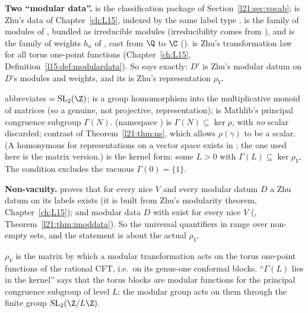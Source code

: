 \begin{dictionary}
\textbf{Two ``modular data''.}  is the classification package of
Section~\ref{l21:sec:vocab};  is Zhu's data of Chapter~\ref{ch:L15}, indexed by the same
label type .  is the family of modules of , bundled as irreducible modules (irreducibility
comes from ), and  is the family of weights $h_a$ of , cast from $\Q$ to $\C$
().  is Zhu's transformation law for
all torus one-point functions (Chapter~\ref{ch:L15}, Definition~\ref{l15:def:modulardata}). So  says
exactly: $D'$ is Zhu's modular datum on $D$'s modules and weights, and its  is Zhu's representation $\rho_V$.

 abbreviates  $=\ltwooneSL(\Z)$;  is a group homomorphism into
the multiplicative monoid of matrices (so a genuine, not projective, representation);  is
Mathlib's principal congruence subgroup $\Gamma(N)$.  (namespace ) is
$\Gamma(N)\subseteq\ker\rho$, with \emph{no} scalar discarded; contrast  of
Theorem~\ref{l21:thm:ns}, which allows $\rho(\gamma)$ to be a scalar. (A homonymous  for
representations on a vector space exists in ; the one used here is the matrix version.)
 is the kernel form: some $L>0$ with $\Gamma(L)\subseteq\ker\rho_V$. The condition 
excludes the vacuous $\Gamma(0)=\{1\}$.

\textbf{Non-vacuity.}  proves that for every nice $V$ and every modular datum $D$ a Zhu datum on its labels
exists (it is built from Zhu's modularity theorem, Chapter~\ref{ch:L15}); and modular data $D$ with  exist
for every nice $V$ (, Theorem~\ref{l21:thm:imoddata}). So the universal quantifiers in
 range over non-empty sets, and the statement is about the actual $\rho_V$.
\end{dictionary}

\begin{physics}
$\rho_V$ is the matrix by which a modular transformation acts on the torus one-point functions of the rational CFT, i.e.\ on
its genus-one conformal blocks. ``$\Gamma(L)$ lies in the kernel'' says that the torus blocks are modular functions for the
principal congruence subgroup of level $L$: the modular group acts on them through the finite group
$\ltwooneSL(\Z/L\Z)$.
\end{physics}

